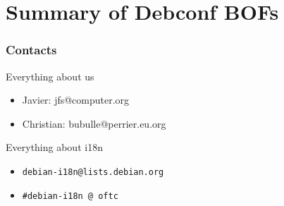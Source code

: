 \documentclass{beamer}
\begin{document}
\section{Summary of Debconf BOFs}

\begin{frame}
  \frametitle{Contacts}
	\begin{block}
		{Everything about us}
		\begin{itemize}
		\item
			{Javier: jfs@computer.org}
		\item
			{Christian: bubulle@perrier.eu.org}
		\end{itemize}
	\end{block}
	\begin{block}
		{Everything about i18n}
		\begin{itemize}
		\item
			{\texttt{debian-i18n@lists.debian.org}}
		\item
			{\texttt{\#debian-i18n @ oftc}}
		\end{itemize}
	\end{block}
\end{frame}
\end{document}
